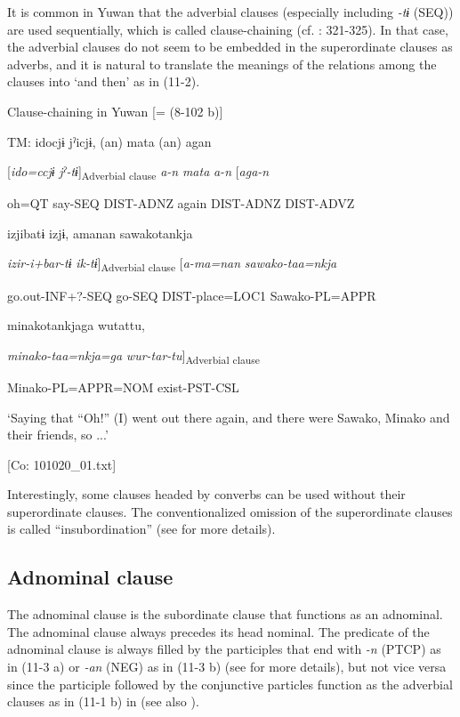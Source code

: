 It is common in Yuwan that the adverbial clauses (especially including \textit{{}-tɨ} (SEQ)) are used sequentially, which is called clause-chaining (cf. \citealt{Payne1997}: 321-325). In that case, the adverbial clauses do not seem to be embedded in the superordinate clauses as adverbs, and it is natural to translate the meanings of the relations among the clauses into ‘and then’ as in (11-2).

\ea\label{ex:11-2}  Clause-chaining in Yuwan [= (8-102 b)]

  TM:  idocjɨ  jˀicjɨ,  (an)  mata  (an)  agan

    [\textit{ido=ccjɨ}  \textit{jˀ-tɨ}]\textsubscript{Adverbial clause}  \textit{a-n}  \textit{mata}  \textit{a-n}  [\textit{aga-n}

    oh=QT  say-SEQ  DIST-ADNZ  again  DIST-ADNZ  DIST-ADVZ

    izjibatɨ  izjɨ,  amanan  sawakotankja

    \textit{izir-i+bar-tɨ}  \textit{ik-tɨ}]\textsubscript{Adverbial clause}\textbf{  }[\textit{a-ma=nan}  \textit{sawako-taa=nkja}

    go.out-INF+?-SEQ  go-SEQ  DIST-place=LOC1  Sawako-PL=APPR

    minakotankjaga  wutattu,

    \textit{minako-taa=nkja=ga}  \textit{wur-tar-tu}]\textsubscript{Adverbial clause}

    Minako-PL=APPR=NOM  exist-PST-CSL

    ‘Saying that “Oh!” (I) went out there again, and there were Sawako, Minako and their friends, so ...’

    [Co: 101020\_01.txt]
\z

Interestingly, some clauses headed by converbs can be used without their superordinate clauses. The conventionalized omission of the superordinate clauses is called “insubordination” (see  for more details).

\subsection{Adnominal clause}\label{sec:11.1.2}

The adnominal clause is the subordinate clause that functions as an adnominal. The adnominal clause always precedes its head nominal. The predicate of the adnominal clause is always filled by the participles that end with \textit{{}-n} (PTCP) as in (11-3 a) or \textit{{}-an} (NEG) as in (11-3 b) (see  for more details), but not vice versa since the participle followed by the conjunctive particles function as the adverbial clauses as in (11-1 b) in  (see also ).

